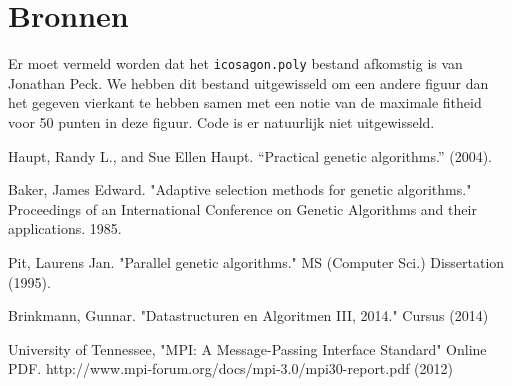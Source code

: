 \section{Bronnen}
Er moet vermeld worden dat het \texttt{icosagon.poly} bestand afkomstig is van Jonathan Peck. We hebben dit bestand uitgewisseld om een andere figuur dan het gegeven vierkant te hebben samen met een notie van de maximale fitheid voor 50 punten in deze figuur. Code is er natuurlijk niet uitgewisseld.

\begin{thebibliography}{9}

  Haupt, Randy L., and Sue Ellen Haupt. ``Practical genetic algorithms.'' (2004).

Baker, James Edward. "Adaptive selection methods for genetic algorithms." Proceedings of an International Conference on Genetic Algorithms and their applications. 1985.

Pit, Laurens Jan. "Parallel genetic algorithms." MS (Computer Sci.) Dissertation (1995).

Brinkmann, Gunnar. "Datastructuren en Algoritmen III, 2014." Cursus (2014)

University of Tennessee, "MPI: A Message-Passing Interface Standard" Online PDF. http://www.mpi-forum.org/docs/mpi-3.0/mpi30-report.pdf (2012)



\end{thebibliography}
